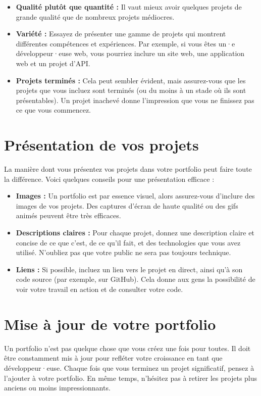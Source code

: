\begin{itemize}
  \item \textbf{Qualité plutôt que quantité :} Il vaut mieux avoir quelques projets de grande qualité que de nombreux projets médiocres.
  \item \textbf{Variété :} Essayez de présenter une gamme de projets qui montrent différentes compétences et expériences. Par exemple, si vous êtes un·e développeur·euse web, vous pourriez inclure un site web, une application web et un projet d'API.
  \item \textbf{Projets terminés :} Cela peut sembler évident, mais assurez-vous que les projets que vous incluez sont terminés (ou du moins à un stade où ils sont présentables). Un projet inachevé donne l'impression que vous ne finissez pas ce que vous commencez.
\end{itemize}

\section{Présentation de vos projets}

La manière dont vous présentez vos projets dans votre portfolio peut faire toute la différence. Voici quelques conseils pour une présentation efficace :

\begin{itemize}
  \item \textbf{Images :} Un portfolio est par essence visuel, alors assurez-vous d'inclure des images de vos projets. Des captures d'écran de haute qualité ou des gifs animés peuvent être très efficaces.
  \item \textbf{Descriptions claires :} Pour chaque projet, donnez une description claire et concise de ce que c'est, de ce qu'il fait, et des technologies que vous avez utilisé. N'oubliez pas que votre public ne sera pas toujours technique.
  \item \textbf{Liens :} Si possible, incluez un lien vers le projet en direct, ainsi qu'à son code source (par exemple, sur GitHub). Cela donne aux gens la possibilité de voir votre travail en action et de consulter votre code.
\end{itemize}

\section{Mise à jour de votre portfolio}

Un portfolio n'est pas quelque chose que vous créez une fois pour toutes. Il doit être constamment mis à jour pour refléter votre croissance en tant que développeur·euse. Chaque fois que vous terminez un projet significatif, pensez à l'ajouter à votre portfolio. En même temps, n'hésitez pas à retirer les projets plus anciens ou moins impressionnants.

